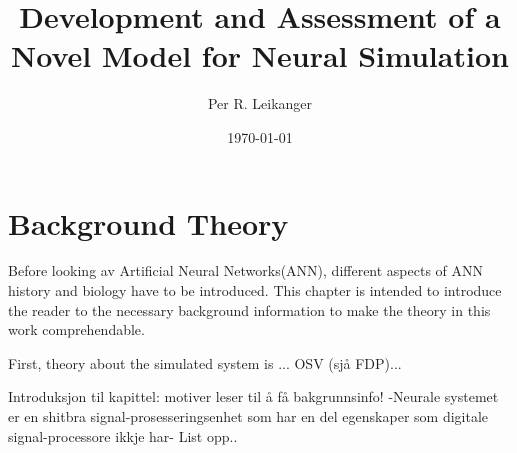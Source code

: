 \documentclass[b5paper,12 pt]{report}
\author{Per R. Leikanger}
\title{Development and Assessment of a Novel Model for Neural Simulation}
\date{\today}
\begin{document}
   



\pagestyle{empty} %

\maketitle







\pagestyle{empty} 

\tableofcontents %
\cleardoublepage %

\listoffigures

\setcounter{page}{1} %
\pagestyle{plain} %















\chapter{Background Theory}
	Before looking av Artificial Neural Networks(ANN), different aspects of ANN history and biology have to be introduced.
	This chapter is intended to introduce the reader to the necessary background information to make the theory in this work comprehendable.

	First, theory about the simulated system is ... OSV (sjå FDP)...

	Introduksjon til kapittel: motiver leser til å få bakgrunnsinfo!
	-Neurale systemet er en shitbra signal-prosesseringsenhet som har en del egenskaper som digitale signal-processore ikkje har- List opp..
	
	
% 	




%	
%	
%	
%	
%	
%	
%
% 	
\end{document}
